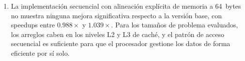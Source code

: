 \begin{enumerate}
    \item La implementación secuencial con alineación explícita de memoria a
    64~bytes no muestra ninguna mejora significativa respecto a la versión base,
    con speedups entre $0.988\times$ y $1.039\times$. Para los tamaños de
    problema evaluados, los arreglos caben en los niveles L2 y L3 de caché, y
    el patrón de acceso secuencial es suficiente para que el procesador gestione
    los datos de forma eficiente por sí solo.

\end{enumerate}